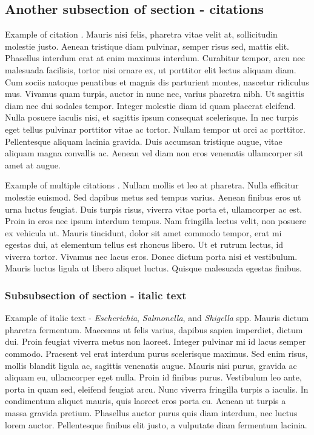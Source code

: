 \subsection{Another subsection of section - citations}
Example of citation \citep{altschul1997gapped}. Mauris nisi felis, pharetra vitae velit at, sollicitudin molestie justo. Aenean tristique diam pulvinar, semper risus sed, mattis elit. Phasellus interdum erat at enim maximus interdum. Curabitur tempor, arcu nec malesuada facilisis, tortor nisi ornare ex, ut porttitor elit lectus aliquam diam. Cum sociis natoque penatibus et magnis dis parturient montes, nascetur ridiculus mus. Vivamus quam turpis, auctor in nunc nec, varius pharetra nibh. Ut sagittis diam nec dui sodales tempor. Integer molestie diam id quam placerat eleifend. Nulla posuere iaculis nisi, et sagittis ipsum consequat scelerisque. In nec turpis eget tellus pulvinar porttitor vitae ac tortor. Nullam tempor ut orci ac porttitor. Pellentesque aliquam lacinia gravida. Duis accumsan tristique augue, vitae aliquam magna convallis ac. Aenean vel diam non eros venenatis ullamcorper sit amet at augue. 


Example of multiple citations \citep{altschul1997gapped,baker2007novel}. Nullam mollis et leo at pharetra. Nulla efficitur molestie euismod. Sed dapibus metus sed tempus varius. Aenean finibus eros ut urna luctus feugiat. Duis turpis risus, viverra vitae porta et, ullamcorper ac est. Proin in eros nec ipsum interdum tempus. Nam fringilla lectus velit, non posuere ex vehicula ut. Mauris tincidunt, dolor sit amet commodo tempor, erat mi egestas dui, at elementum tellus est rhoncus libero. Ut et rutrum lectus, id viverra tortor. Vivamus nec lacus eros. Donec dictum porta nisi et vestibulum. Mauris luctus ligula ut libero aliquet luctus. Quisque malesuada egestas finibus. 
\subsubsection{Subsubsection of section - italic text}
Example of italic text - {\it Escherichia}, {\it Salmonella}, and {\it Shigella} spp. Mauris dictum pharetra fermentum. Maecenas ut felis varius, dapibus sapien imperdiet, dictum dui. Proin feugiat viverra metus non laoreet. Integer pulvinar mi id lacus semper commodo. Praesent vel erat interdum purus scelerisque maximus. Sed enim risus, mollis blandit ligula ac, sagittis venenatis augue. Mauris nisi purus, gravida ac aliquam eu, ullamcorper eget nulla. Proin id finibus purus. Vestibulum leo ante, porta in quam sed, eleifend feugiat arcu. Nunc viverra fringilla turpis a iaculis. In condimentum aliquet mauris, quis laoreet eros porta eu. Aenean ut turpis a massa gravida pretium. Phasellus auctor purus quis diam interdum, nec luctus lorem auctor. Pellentesque finibus elit justo, a vulputate diam fermentum lacinia. 
